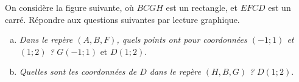 \documentclass[12pt]{article}
\begin{document}
\begin{exercice}
On considère la figure suivante, où $BCGH$ est un rectangle, et $EFCD$ est un carré. Répondre aux questions suivantes par lecture graphique.

\begin{multicols}{2}

\begin{center}
\end{center}


\begin{enumerate}[(a)]
  \item \emph{Dans le repère $(A, B, F)$, quels points ont pour coordonnées $(-1;1)$ et $(1; 2)$ ?} $G(-1;1)$ et $D(1;2)$.
  \item \emph{Quelles sont les coordonnées de $D$ dans le repère $(H, B, G)$ ?} $D(1;2)$.
\end{enumerate}
\end{multicols}

\end{exercice}
\end{document}
